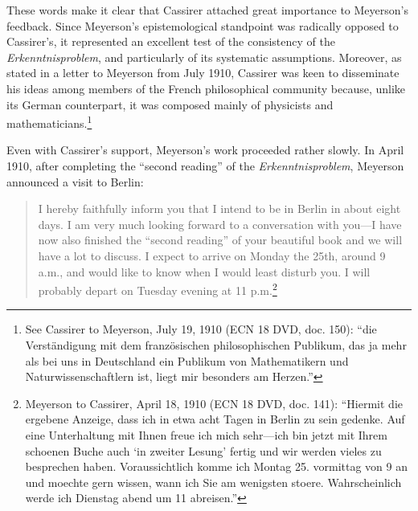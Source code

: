 These words make it clear that Cassirer attached great importance to Meyerson's feedback. Since Meyerson's epistemological standpoint was radically opposed to Cassirer's, it represented an excellent test of the consistency of the \emph{Erkenntnisproblem}, and particularly of its systematic assumptions. Moreover, as stated in a letter to Meyerson from July 1910, Cassirer was keen to disseminate his ideas among members of the French philosophical community because, unlike its German counterpart, it was composed mainly of physicists and mathematicians.\footnote{See Cassirer to Meyerson, July 19, 1910 (ECN 18 DVD, doc. 150): ``die Verständigung mit dem französischen philosophischen Publikum, das ja mehr als bei uns in Deutschland ein Publikum von Mathematikern und Naturwissenschaftlern ist, liegt mir besonders am Herzen.''}

Even with Cassirer's support, Meyerson's work proceeded rather slowly. In April 1910, after completing the ``second reading'' of the \emph{Erkenntnisproblem}, Meyerson announced a visit to Berlin:

\begin{quote}
I hereby faithfully inform you that I intend to be in Berlin in about eight days. I am very much looking forward to a conversation with you---I have now also finished the ``second reading'' of your beautiful book and we will have a lot to discuss. I expect to arrive on Monday the 25th, around 9 a.m., and would like to know when I would least disturb you. I will probably depart on Tuesday evening at 11 p.m.\footnote{Meyerson to Cassirer, April 18, 1910 (ECN 18 DVD, doc. 141): ``Hiermit die ergebene Anzeige, dass ich in etwa acht Tagen in Berlin zu sein gedenke. Auf eine Unterhaltung mit Ihnen freue ich mich sehr---ich bin jetzt mit Ihrem schoenen Buche auch `in zweiter Lesung' fertig und wir werden vieles zu besprechen haben. Voraussichtlich komme ich Montag 25. vormittag von 9 an und moechte gern wissen, wann ich Sie am wenigsten stoere. Wahrscheinlich werde ich Dienstag abend um 11 abreisen.''}
\end{quote}

